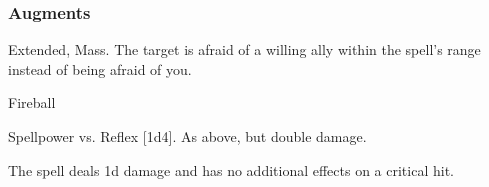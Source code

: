\subsubsection{Augments}
 Extended, Mass.
The target is afraid of a willing ally within the spell's range instead of being afraid of you.
\begin{spellsection}{Fireball}
\begin{spellheader}
\end{spellheader}
\begin{spellcontent}
\begin{spelltargetinginfo}
\end{spelltargetinginfo}
\begin{spelleffects}
\begin{spellattack}{Spellpower vs. Reflex}
\spellsuccess {}[1d4].
\spellcritical As above, but double damage.
\end{spellattack}
\end{spelleffects}
\end{spellcontent}
\begin{spellfooter}
\miscastexplode
\end{spellfooter}
\begin{spellcantrip}
The spell deals \minus1d damage and has no additional effects on a critical hit.
\end{spellcantrip}
\end{spellsection}

